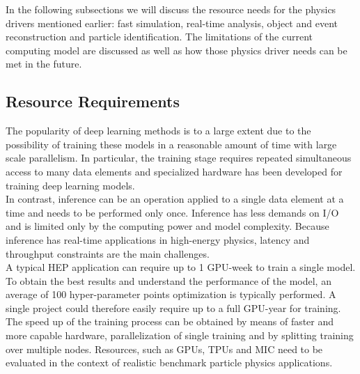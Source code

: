 In the following subsections we will discuss the resource needs for the physics drivers mentioned earlier: fast simulation, real-time analysis, object and event reconstruction and particle identification. The limitations of the current computing model are discussed as well as how those physics driver needs can be met in the future.



\subsection{Resource Requirements}

The popularity of deep learning methods is to a large extent due to the possibility of training these models in a reasonable amount of time with large scale parallelism. In particular, the training stage requires repeated simultaneous access to many data elements and specialized hardware has been developed for training deep learning models.\\ %

In contrast, inference can be an operation applied to a single data element at a time and needs to be performed only once. Inference has less demands on I/O and is limited only by the computing power and model complexity. Because inference has real-time applications in high-energy physics, latency and throughput constraints are the main challenges.\\

A typical HEP application can require up to 1 GPU-week to train a single model.
To obtain the best results and understand the performance of the model, an average of 100 hyper-parameter points optimization is typically performed. A single project could therefore easily require up to a full GPU-year for training.
The speed up of the training process can be obtained by means of faster and more capable hardware, parallelization of single training and by splitting training over multiple nodes. Resources, such as GPUs, TPUs and MIC need to be evaluated in the context of realistic benchmark particle physics applications.\\

